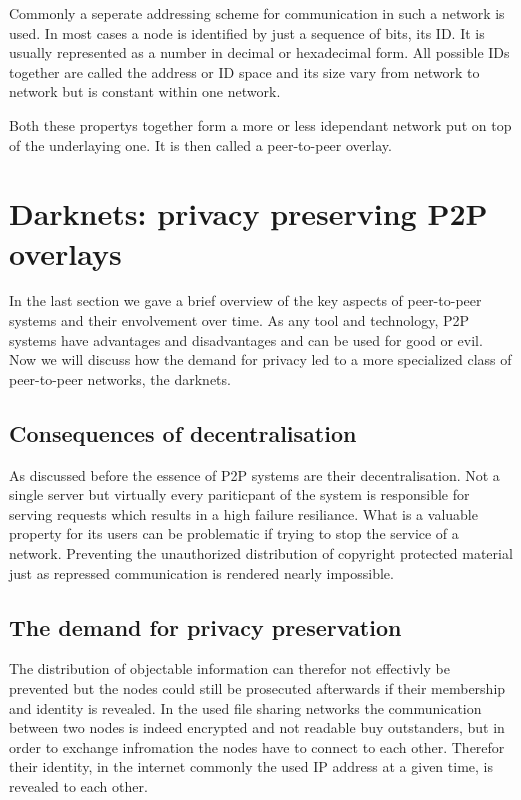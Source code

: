 Commonly a seperate addressing scheme for communication in such a network is used. In most cases a node is identified by just a sequence of bits, its ID. It is usually represented as a number in decimal or hexadecimal form. All possible IDs together are called the address or ID space and its size vary from network to network but is constant within one network.

Both these propertys together form a more or less idependant network put on top of the underlaying one. It is then called a peer-to-peer overlay.


\section{Darknets: privacy preserving P2P overlays}

In the last section we gave a brief overview of the key aspects of peer-to-peer systems and their envolvement over time. As any tool and technology, P2P systems have advantages and disadvantages and can be used for good or evil. Now we will discuss how the demand for privacy led to a more specialized class of peer-to-peer networks, the darknets.

\subsection{Consequences of decentralisation}

As discussed before the essence of P2P systems are their decentralisation. Not a single server but virtually every pariticpant of the system is responsible for serving requests which results in a high failure resiliance. What is a valuable property for its users can be problematic if trying to stop the service of a network. Preventing the unauthorized distribution of copyright protected material just as repressed communication is rendered nearly impossible. 

\subsection{The demand for privacy preservation}

The distribution of objectable information can therefor not effectivly be prevented but the nodes could still be prosecuted afterwards if their membership and identity is revealed. In the used file sharing networks the communication between two nodes is indeed encrypted and not readable buy outstanders, but in order to exchange infromation the nodes have to connect to each other. Therefor their identity, in the internet commonly the used IP address at a given time, is revealed to each other.

